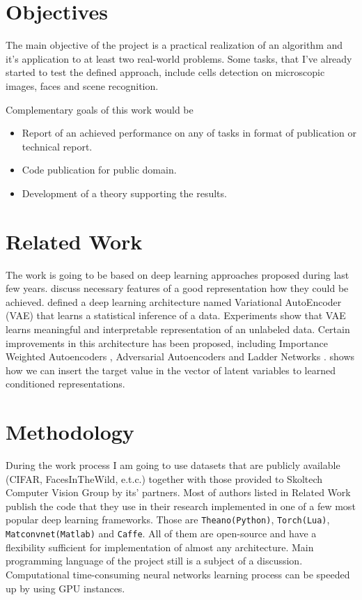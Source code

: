 \documentclass[a4paper]{article}
\begin{document}
\section{Objectives}

The main objective of the project is a practical realization of an algorithm and it's application to at least two real-world problems. Some tasks, that I've already started to test the defined approach, include cells detection on microscopic images, faces and scene recognition.

Complementary goals of this work would be
\begin{itemize}
\item Report of an achieved performance on any of tasks in format of publication or technical report.
\item Code publication for public domain.
\item Development of a theory supporting the results.
\end{itemize}

\section{Related Work}

The work is going to be based on deep learning approaches proposed during last few years. \citep{Bengio12} discuss necessary features of a good representation how they could be achieved. \citep{Kingma13} defined a deep learning architecture named Variational AutoEncoder (VAE) that learns a statistical inference of a data. Experiments show that VAE learns meaningful and interpretable representation of an unlabeled data. Certain improvements in this architecture has been proposed, including Importance Weighted Autoencoders \citep{BurdaGS15}, Adversarial Autoencoders \citep{MakhzaniSJG15} and Ladder Networks \citep{RasmusVHBR15}. \citep{KulkarniWKT15} shows how we can insert the target value in the vector of latent variables to learned conditioned representations.

\section{Methodology}

During the work process I am going to use datasets that are publicly available (CIFAR, FacesInTheWild, e.t.c.) together with those provided to Skoltech Computer Vision Group by its' partners. Most of authors listed in Related Work publish the code that they use in their research implemented in one of a few most popular deep learning frameworks. Those are \texttt{Theano(Python)}, 
\texttt{Torch(Lua)}, \texttt{Matconvnet(Matlab)} and \texttt{Caffe}. All of them are open-source and  have a flexibility sufficient for implementation of almost any architecture. Main programming language of the project still is a subject of a discussion. Computational time-consuming neural networks learning process can be speeded up by using GPU instances.
\end{document}
